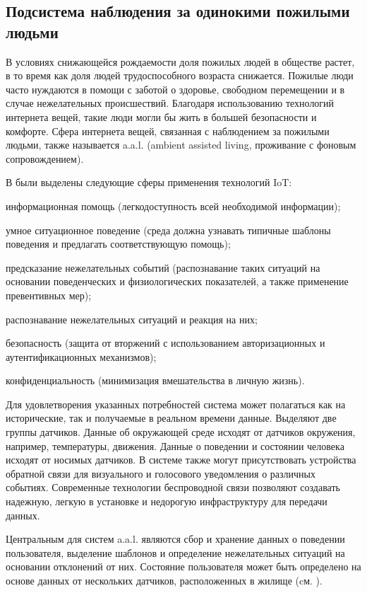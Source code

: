 \subsection{Подсистема наблюдения за одинокими пожилыми людьми}

В условиях снижающейся рождаемости доля пожилых людей в обществе растет, в то время как доля людей трудоспособного возраста снижается. Пожилые люди часто нуждаются в помощи с заботой о здоровье, свободном перемещении и в случае нежелательных происшествий. Благодаря использованию технологий интернета вещей, такие люди могли бы жить в большей безопасности и комфорте. Сфера интернета вещей, связанная с наблюдением за пожилыми людьми, также называется a.a.l. (ambient assisted living, проживание с фоновым сопровождением).

В  были выделены следующие сферы применения технологий IoT:

\begin{textitemize}
	\item информационная помощь (легкодоступность всей необходимой информации);
	\item умное ситуационное поведение (среда должна узнавать типичные шаблоны поведения и предлагать соответствующую помощь);
	\item предсказание нежелательных событий (распознавание таких ситуаций на основании поведенческих и физиологических показателей, а также применение превентивных мер);
	\item распознавание нежелательных ситуаций и реакция на них;
	\item безопасность (защита от вторжений с использованием авторизационных и аутентификационных механизмов);
	\item конфиденциальность (минимизация вмешательства в личную жизнь).
\end{textitemize}

Для удовлетворения указанных потребностей система может полагаться как на исторические, так и получаемые в реальном времени данные. Выделяют две группы датчиков. Данные об окружающей среде исходят от датчиков окружения, например, температуры, движения. Данные о поведении и состоянии человека исходят от носимых датчиков. В системе также могут присутствовать устройства обратной связи для визуального и голосового уведомления о различных событиях. Современные технологии беспроводной связи позволяют создавать надежную, легкую в установке и недорогую инфраструктуру для передачи данных.

Центральным для систем a.a.l. являются сбор и хранение данных о поведении пользователя, выделение шаблонов и определение нежелательных ситуаций на основании отклонений от них. Состояние пользователя может быть определено на основе данных от нескольких датчиков, расположенных в жилище (cм. ).

